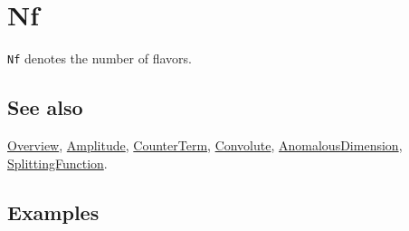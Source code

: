 \documentclass[../FeynCalcManual.tex]{subfiles}
\begin{document}
\hypertarget{nf}{
\section{Nf}\label{nf}}

\texttt{Nf} denotes the number of flavors.

\subsection{See also}

\hyperlink{toc}{Overview}, \hyperlink{amplitude}{Amplitude},
\hyperlink{counterterm}{CounterTerm}, \hyperlink{convolute}{Convolute},
\hyperlink{anomalousdimension}{AnomalousDimension},
\hyperlink{splittingfunction}{SplittingFunction}.

\subsection{Examples}
\end{document}
